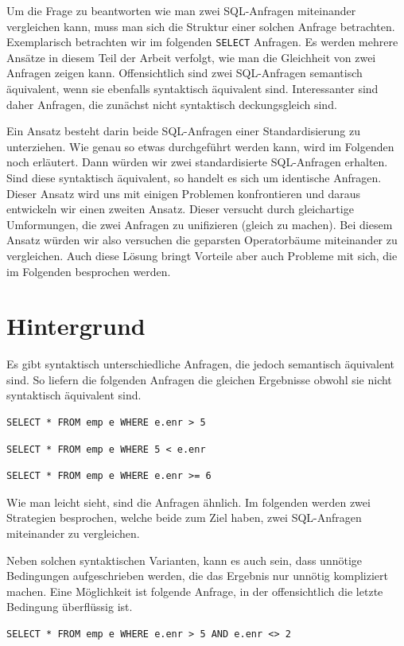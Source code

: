 Um die Frage zu beantworten wie man zwei SQL-Anfragen miteinander vergleichen kann, muss man sich die Struktur einer solchen Anfrage betrachten. Exemplarisch betrachten wir im folgenden \verb|SELECT| Anfragen. Es werden mehrere Ansätze in diesem Teil der Arbeit verfolgt, wie man die Gleichheit von zwei Anfragen zeigen kann. Offensichtlich sind zwei SQL-Anfragen semantisch äquivalent, wenn sie ebenfalls syntaktisch äquivalent sind. Interessanter sind daher Anfragen, die zunächst nicht syntaktisch deckungsgleich sind. 

Ein Ansatz besteht darin beide SQL-Anfragen einer Standardisierung zu unterziehen. Wie genau so etwas durchgeführt werden kann, wird im Folgenden noch erläutert. Dann würden wir zwei standardisierte SQL-Anfragen erhalten. Sind diese syntaktisch äquivalent, so handelt es sich um identische Anfragen. Dieser Ansatz wird uns mit einigen Problemen konfrontieren und daraus entwickeln wir einen zweiten Ansatz. Dieser versucht durch gleichartige Umformungen, die zwei Anfragen zu unifizieren (gleich zu machen). Bei diesem Ansatz würden wir also versuchen die geparsten Operatorbäume miteinander zu vergleichen. Auch diese Lösung bringt Vorteile aber auch Probleme mit sich, die im Folgenden besprochen werden.

\section{Hintergrund}

Es gibt syntaktisch unterschiedliche Anfragen, die jedoch semantisch äquivalent sind. So liefern die folgenden Anfragen die gleichen Ergebnisse obwohl sie nicht syntaktisch äquivalent sind.

\begin{verbatim}
SELECT * FROM emp e WHERE e.enr > 5
\end{verbatim}

\begin{verbatim}
SELECT * FROM emp e WHERE 5 < e.enr
\end{verbatim}

\begin{verbatim}
SELECT * FROM emp e WHERE e.enr >= 6
\end{verbatim}

Wie man leicht sieht, sind die Anfragen ähnlich. Im folgenden werden zwei Strategien besprochen, welche beide zum Ziel haben, zwei SQL-Anfragen miteinander zu vergleichen.

Neben solchen syntaktischen Varianten, kann es auch sein, dass unnötige Bedingungen aufgeschrieben werden, die das Ergebnis nur unnötig kompliziert machen. Eine Möglichkeit ist folgende Anfrage, in der offensichtlich die letzte Bedingung überflüssig ist.
\begin{verbatim}
SELECT * FROM emp e WHERE e.enr > 5 AND e.enr <> 2
\end{verbatim}

